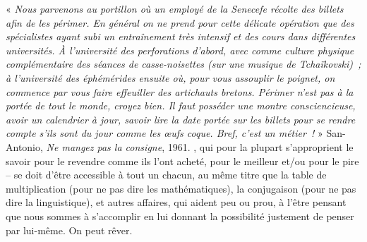 {« \textit{Nous parvenons au portillon où un employé de la Senecefe récolte des billets afin de les périmer. En général on ne prend pour cette délicate opération que des spécialistes ayant subi un entraînement très intensif et des cours dans différentes universités. À l’université des perforations d’abord, avec comme culture physique complémentaire des séances de casse-noisettes (sur une musique de Tchaïkovski) ; à l’université des éphémérides ensuite où, pour vous assouplir le poignet, on commence par vous faire effeuiller des artichauts bretons. Périmer n’est pas à la portée de tout le monde, croyez bien. Il faut posséder une montre consciencieuse, avoir un calendrier à jour, savoir lire la date portée sur les billets pour se rendre compte s’ils sont du jour comme les œufs coque. Bref, c’est un métier !} » San-Antonio, \textit{Ne mangez pas la consigne}, 1961.
}, qui pour la plupart s'approprient le savoir pour le revendre comme ils l'ont acheté, pour le meilleur et/ou pour le pire -- se doit d'être accessible à tout un chacun, au même titre que la table de multiplication (pour ne pas dire les mathématiques), la conjugaison (pour ne pas dire la linguistique), et autres affaires, qui aident peu ou prou, à l'être pensant que nous sommes à s'accomplir en lui donnant la possibilité justement de penser par lui-même. On peut rêver.
